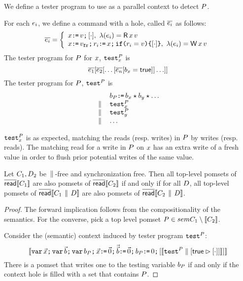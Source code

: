 We define a tester program to use as a parallel context to detect $P$. 
\begin{definition}\label{testAPS}
For each $e_i$, we define a command with a hole, called $\overline{e_i}$ as follows:
\[
\test{\aEv_i} = \left\{ 
                             \begin{array}{l}
                              \aLoc\GETS\aVal \SEMI \hole{\cdot}, \ \labeling(\aEv_i) = \DR{\aLoc}{\aVal} \\
                              \aLoc\GETS\freshaval\SEMI \aReg_i \GETS\aLoc \SEMI \IF{\aReg_i = \aVal} \THEN \hole{\cdot} \FI , \ \labeling(\aEv_i) = \DW{\aLoc}{\aVal} \\
                           \end{array}
                       \right.
\]    
The tester program for $P$ for $x$, ${\tt test}^{P}_{x}$ is \[ \overline{e_1}[\overline{e_2}[\ldots [\overline{e_n}[b_{x} = \mathsf{true}]]\ldots]] \]
The tester program for $P$, ${\tt test}^{P}_{}$ is 
\[
\begin{array}{ll}
& b_{P}\texttt{:}\mkern-1mu\texttt{=}\, b_{x} \star b_{y} \star  \ldots   \\
\,\mathbin{\|}\, & {\tt test}^{P}_{x} \\
\,\mathbin{\|}\, & {\tt test}^{P}_{y} \\
 \,\mathbin{\|}\,  & \ldots 
\end{array}
\]
\end{definition}
 ${\tt test}^{P}_{x}$ is as expected, matching the reads (resp. writes) in $P$ by writes (resp. reads).  The matching read for a write in $P$ on $x$ has an extra write of a fresh value in order to flush prior potential writes of the same value.    

 

\begin{theorem}
Let $C_1, D_2$ be $\,\mathbin{\|}\,$-free and synchronization free.  Then all top-level pomsets of $\overline{\mathsf{read}}\llbracket C_1\rrbracket$ are also pomsets of
$\overline{\mathsf{read}}\llbracket C_2\rrbracket$ if and only if for all $D$, all top-level pomsets of $\overline{\mathsf{read}}\llbracket C_1 \,\mathbin{\|}\, D\rrbracket$ are also pomsets of
$\overline{\mathsf{read}}\llbracket C_2 \,\mathbin{\|}\, D\rrbracket$.
\begin{proof}
The forward implication follows from the compositionality of the semantics. For the converse, pick a top level pomset $P \in \\sem{C_1} \setminus \llbracket C_2\rrbracket $. 

Consider the (semantic) context induced by tester program ${\tt test}^{P}_{}$:
\[ \llbracket\texttt{var}\,\vec{x}\texttt{;}\, \texttt{var}\,\vec{b} \texttt{;}\, \texttt{var}\, b_{P} \texttt{;}\,
    \vec{x}\texttt{:}\mkern-1mu\texttt{=}\,\vec{0}\texttt{;}\,
    \vec{\vec{b}}\texttt{:}\mkern-1mu\texttt{=}\,\vec{0} 
    \texttt{;}\, b_{P}\texttt{:}\mkern-1mu\texttt{=}\, 0 \texttt{;}\,  [\llbracket{\tt test}^{P}_{} \parallel [\mathsf{true} \mathbin\rhd [\cdot]]\rrbracket]\rrbracket
\]
There is a pomset that writes one to the  testing variable $b_{P}$ if and only if the context hole is filled with a set that contains $P$.  
\end{proof}
\end{theorem}

